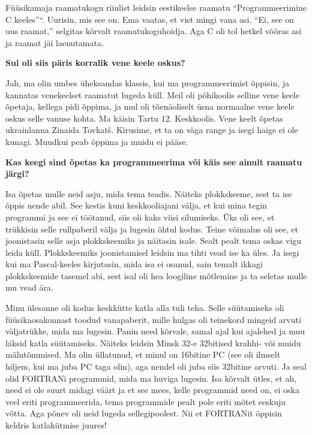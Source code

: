 Füüsikamaja raamatukogu riiulist leidsin eestikeelse raamatu
\enquote{Programmeerimine C keeles}“. Uurisin, mis see on. Ema vaatas, et vist mingi vana asi.
\enquote{Ei, see on uus raamat,} selgitas kõrvalt raamatukoguhoidja. Aga C oli tol hetkel
võõras asi ja raamat jäi laenutamata.

\textbf{Sul oli siis päris korralik vene keele oskus?}

Jah, ma olin umbes üheksandas klassis, kui ma programmeerimist õppisin, ja
kannatas venekeelset raamatut lugeda küll. Meil oli põhikoolis selline vene
keele õpetaja, kellega pidi õppima, ja mul oli tõenäoliselt üsna normaalne vene
keele oskus selle vanuse kohta. Ma käisin Tartu 12.
Keskkoolis. Vene keelt õpetas ukrainlanna Zinaida
Tovkatš. Kirusime, et ta on väga range ja
isegi haige ei ole kunagi. Muudkui peab õppima ja muidu ei pääse.

\textbf{Kas keegi sind õpetas ka programmeerima või käis see ainult raamatu järgi?}

Isa õpetas mulle neid asju, mida tema teadis. Näiteks 
plokkskeeme, sest ta ise õppis nende abil. See kestis kuni keskkooliajani
välja, et kui mina tegin programmi ja see ei töötanud, siis oli kaks viisi
silumiseks. Üks oli see, et trükkisin selle rullpaberil välja ja lugesin õhtul kodus.
Teine võimalus oli see, et joonistasin selle asja plokkskeemiks ja näitasin
isale. Sealt pealt tema oskas vigu leida küll. Plokkskeemiks joonistamisel
leidsin ma tihti vead ise ka üles. Ja isegi kui ma Pascal-keeles kirjutasin,
mida isa ei osanud, sain temalt ikkagi plokkskeemide tasemel abi, sest isal
oli hea loogiline mõtlemine ja ta seletas mulle mu vead ära.

Minu ülesanne oli kodus keskkütte katla alla tuli teha. Selle süütamiseks oli
füüsikaosakonnast toodud vanapaberit, mille hulgas oli teinekord mingeid arvuti
väljatrükke, mida ma lugesin. Panin need kõrvale, samal ajal kui ajalehed ja
muu läksid katla süütamiseks. Näiteks leidsin Minsk
32-e 32bitised krahhi- või
muidu mälutõmmised. Ma olin üllatunud, et minul on 16bitine PC (see oli ilmselt
hiljem, kui ma juba PC taga olin), aga nendel oli juba siis 32bitine
arvuti. Ja seal olid FORTRANi programmid, mida ma huviga lugesin. Isa kõrvalt
ütles, et ah, need ei ole suurt midagi väärt ja et see mees, kelle programmid
need on, ei oska veel eriti programmeerida, tema programmide pealt pole eriti
mõtet eeskuju võtta. Aga põnev oli neid lugeda sellegipoolest. Nii et FORTRANit
õppisin keldris katlakütmise juures!

